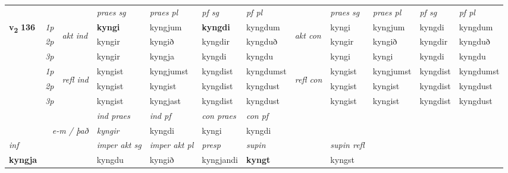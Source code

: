 \begin{longtable}[l]{X>{\footnotesize\itshape}llXXXXlXXXX}
 & &   & \textit{praes sg}  & \textit{praes pl}    & \textit{ pf sg} & \textit{pf pl} & & \textit{praes sg}  & \textit{praes pl}    & \textit{pf sg} & \textit{pf pl }  \\ \cmidrule{4-7} \cmidrule{9-12}
 \multirow{2}{*}{{{\textbf{v{\textsubscript{2}}} \Large{\textbf{136}}}}}  & 1p & \multirow{3}{*}{\begin{turn}{90}\textit{akt ind}\end{turn}} & \textbf{kyngi} & kyngjum & \textbf{kyngdi} & kyngdum & \multirow{3}{*}{\begin{turn}{90}\textit{akt con}\end{turn}} &kyngi & kyngjum & kyngdi & kyngdum\\*
 & 2p &  &  kyngir  & kyngið & kyngdir & kyngduð & & kyngir & kyngið & kyngdir & kyngduð \\*
 & 3p &  & kyngir & kyngja & kyngdi & kyngdu & & kyngi & kyngi& kyngdi & kyngdu \\*
\cmidrule{4-7} \cmidrule{9-12}
 & 1p & \multirow{3}{*}{\begin{turn}{90}\textit{refl ind}\end{turn}}  & kyngist & kyngjumst & kyngdist & kyngdumst & \multirow{3}{*}{\begin{turn}{90}\textit{refl con}\end{turn}}  &kyngist & kyngjumst & kyngdist & kyngdumst \\*
 & 2p &  & kyngist & kyngist & kyngdist & kyngdust & &kyngist & kyngist & kyngdist & kyngdust \\*
 & 3p  & & kyngist & kyngjast & kyngdist & kyngdust & & kyngist & kyngist& kyngdist & kyngdust \\*
\cmidrule{4-7} \cmidrule{9-12}

   && &  \textit{ind praes} & \textit{ind pf} & \textit{con praes} & \textit{con pf} \\*
\multicolumn{3}{r}{\textit{e-m / það}} & kyngir & kyngdi & kyngi & kyngdi \\*

\cmidrule{4-7}
   {\textit{inf}} & &  & \textit{imper akt sg} & \textit{imper akt pl}   & \textit{presp} & \textit{supin} && \textit{supin refl}  \\*
  {\textbf{kyngja}} & && kyngdu  & kyngið   & kyngjandi &  \textbf{kyngt} && kyngst  \\*

\midrule


\end{longtable}
